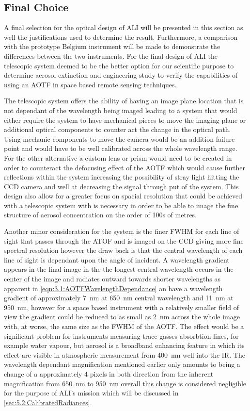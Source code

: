 \subsection{Final Choice}

A final selection for the optical design of ALI will be presented in this section as well the justifications used to determine the result. Furthermore, a comparison with the prototype Belgium instrument will be made to demonstrate the differences between the two instruments. For the final design of ALI the telescopic system deemed to be the better option for our scientific purpose to determine aerosol extinction and engineering study to verify the capabilities of using an AOTF in space based remote sensing techniques.

The telescopic system offers the ability of having an image plane location that is not dependant of the wavelength being imaged leading to a system that would either require the system to have mechanical pieces to move the imaging plane or additional optical components to counter act the change in the optical path. Using mechanic components to move the camera would be an addition failure point and would have to be well calibrated across the whole wavelength range. For the other alternative a custom lens or prism would need to be created in order to counteract the defocusing effect of the AOTF which would cause further reflections within the system increasing the possibility of stray light hitting the CCD camera and well at decreasing the signal through put of the system. This design also allow for a greater focus on spacial resolution that could be achieved with a telescopic system with is necessary in order to be able to image the fine structure of aerosol concentration on the order of 100s of metres.

Another minor consideration for the system is the finer FWHM for each line of sight that passes through the ATOF and is imaged on the CCD giving more fine spectral resolution however the draw back is that the central wavelength of each line of sight is dependant upon the angle of incident. A wavelength gradient appears in the final image in the the longest central wavelength occurs in the center of the image and radiates outward towards shorter wavelengths as apparent in \autoref{eqn:3.1:AOTFWavelengthDependance} an have a wavelength gradient of approximately 7~nm at 650~nm central wavelength and 11~nm at 950~nm, however for a space based instrument with a relatively smaller field of view the gradient could be reduced to as small as 2~nm across the whole image with, at worse, the same size as the FWHM of the AOTF. The effect would be a significant problem for instruments measuring trace gasses absorbtion lines, for example water vapour, but aerosol is a broadband enhancing feature in which its effect are visible in atmospheric measurement from 400~nm well into the IR. The wavelength dependant magnification mentioned earlier only amounts to being a change of a approximately 4 pixels in both direction from the inherent magnification from 650~nm to 950~nm overall this change is considered negligible for the purpose of ALI's mission which will be discussed in \autoref{sec:5.2:CalibratedRadiances}.

